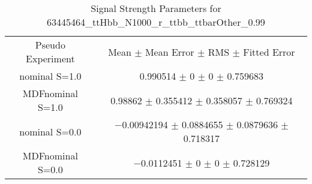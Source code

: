 \begin{table}
\centering
\caption{Signal Strength Parameters for 63445464\_ttHbb\_N1000\_r\_ttbb\_ttbarOther\_0.99}
\begin{tabular}{cc}
\toprule
Pseudo Experiment & Mean $\pm$ Mean Error $\pm$ RMS $\pm$ Fitted Error\\
nominal S=1.0 & \num{0.990514} $\pm$ \num{0} $\pm$ \num{0} $\pm$ \num{0.759683}\\
MDFnominal S=1.0 & \num{0.98862} $\pm$ \num{0.355412} $\pm$ \num{0.358057} $\pm$ \num{0.769324}\\
nominal S=0.0 & \num{-0.00942194} $\pm$ \num{0.0884655} $\pm$ \num{0.0879636} $\pm$ \num{0.718317}\\
MDFnominal S=0.0 & \num{-0.0112451} $\pm$ \num{0} $\pm$ \num{0} $\pm$ \num{0.728129}\\
\bottomrule
\end{tabular}
\end{table}